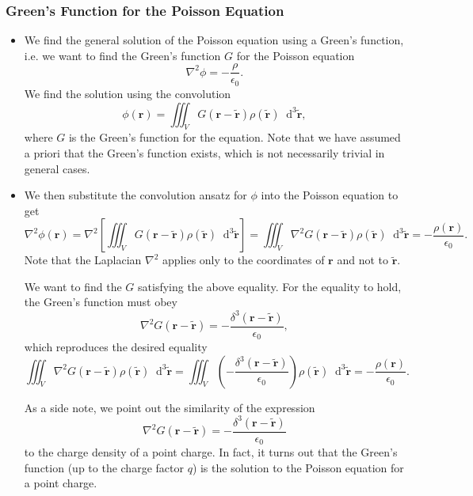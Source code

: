 \documentclass[11pt, a4paper]{article}
\newcommand{\diff}{\mathop{}\!\mathrm{d}} %
\newcommand{\dtr}{\diff^{3} \tilde{\r}}  %
\renewcommand{\vec}[1]{\bm{#1}} %
\renewcommand{\t}[1]{\tilde{#1}} %
\renewcommand{\r}{\vec{r}}
\newcommand{\ee}{\epsilon_{0}}  %
\renewcommand{\laplacian}{\nabla^{2}}
\begin{document}
\subsubsection{Green's Function for the Poisson Equation}
\begin{itemize}
	\item We find the general solution of the Poisson equation using a Green's function, i.e. we want to find the Green's function $ G $ for the Poisson equation
	\begin{equation*}
		\laplacian \phi = - \frac{\rho}{\ee}.
	\end{equation*}
	We find the solution using the convolution
	\begin{equation*}
		\phi(\r) = \iiint_{V} G(\r - \t{\r})\rho(\t{\r}) \dtr,
	\end{equation*}
	where $ G $ is the Green's function for the equation. Note that we have assumed a priori that the Green's function exists, which is not necessarily trivial in general cases.
	
	
	\item We then substitute the convolution ansatz for $ \phi $ into the Poisson equation to get
	\begin{equation*}
		\laplacian \phi(\r) = \laplacian \left[\iiint_{V}  G(\r - \t{\r})\rho(\t{\r}) \dtr \right] = \iiint_{V} \laplacian G(\r - \t{\r})\rho(\t{\r}) \dtr = - \frac{\rho(\r)}{\ee}.
	\end{equation*}
	Note that the Laplacian $ \laplacian $ applies only to the coordinates of $ \r $ and not to $ \t{\r} $.
	
	We want to find the $ G $ satisfying the above equality. For the equality to hold, the Green's function must obey
	\begin{equation*}
		\laplacian G(\r - \t{\r}) = -\frac{\delta^{3}(\r - \t{\r})}{\ee},
	\end{equation*}
	which reproduces the desired equality
	\begin{equation*}
		\iiint_{V} \laplacian G(\r - \t{\r})\rho(\t{\r}) \dtr = \iiint_{V} \left(-\frac{\delta^{3}(\r - \t{\r})}{\ee}\right)\rho(\t{\r}) \dtr =  - \frac{\rho(\r)}{\ee}.
	\end{equation*}
	
	As a side note, we point out the similarity of the expression
	\begin{equation*}
		\laplacian G(\r - \t{\r}) = -\frac{\delta^{3}(\r - \t{\r})}{\ee}
	\end{equation*}
	to the charge density of a point charge. In fact, it turns out that the Green's function (up to the charge factor $ q $) is the solution to the Poisson equation for a point charge. 
	

\end{itemize}
\end{document}
